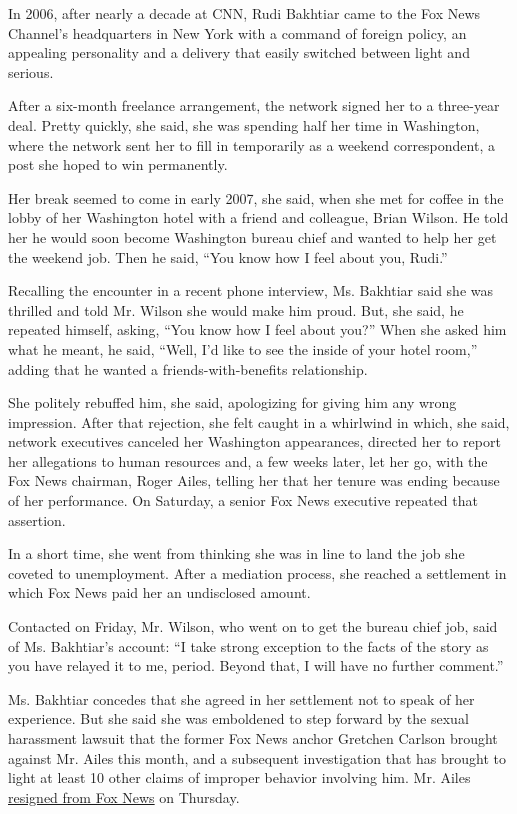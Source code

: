 In 2006, after nearly a decade at CNN, Rudi Bakhtiar came to the Fox
News Channel's headquarters in New York with a command of foreign
policy, an appealing personality and a delivery that easily switched
between light and serious.

After a six-month freelance arrangement, the network signed her to a
three-year deal. Pretty quickly, she said, she was spending half her
time in Washington, where the network sent her to fill in temporarily as
a weekend correspondent, a post she hoped to win permanently.

Her break seemed to come in early 2007, she said, when she met for
coffee in the lobby of her Washington hotel with a friend and colleague,
Brian Wilson. He told her he would soon become Washington bureau chief
and wanted to help her get the weekend job. Then he said, ``You know how
I feel about you, Rudi.''

Recalling the encounter in a recent phone interview, Ms. Bakhtiar said
she was thrilled and told Mr. Wilson she would make him proud. But, she
said, he repeated himself, asking, ``You know how I feel about you?''
When she asked him what he meant, he said, ``Well, I'd like to see the
inside of your hotel room,'' adding that he wanted a
friends-with-benefits relationship.

She politely rebuffed him, she said, apologizing for giving him any
wrong impression. After that rejection, she felt caught in a whirlwind
in which, she said, network executives canceled her Washington
appearances, directed her to report her allegations to human resources
and, a few weeks later, let her go, with the Fox News chairman, Roger
Ailes, telling her that her tenure was ending because of her
performance. On Saturday, a senior Fox News executive repeated that
assertion.

In a short time, she went from thinking she was in line to land the job
she coveted to unemployment. After a mediation process, she reached a
settlement in which Fox News paid her an undisclosed amount.

Contacted on Friday, Mr. Wilson, who went on to get the bureau chief
job, said of Ms. Bakhtiar's account: ``I take strong exception to the
facts of the story as you have relayed it to me, period. Beyond that, I
will have no further comment.''

Ms. Bakhtiar concedes that she agreed in her settlement not to speak of
her experience. But she said she was emboldened to step forward by the
sexual harassment lawsuit that the former Fox News anchor Gretchen
Carlson brought against Mr. Ailes this month, and a subsequent
investigation that has brought to light at least 10 other claims of
improper behavior involving him. Mr. Ailes
\href{http://www.nytimes3xbfgragh.onion/2016/07/22/business/media/roger-ailes-fox-news.html}{resigned
from Fox News} on Thursday.

